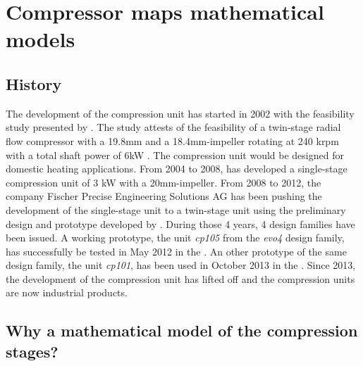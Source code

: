 \chapter{Compressor maps mathematical models}
\label{chap:cp-maps-models}
\resetallacronyms

\section{History}
\label{sec:math-model-cp-history}

The development of the compression unit has started in 2002 with the
feasibility study presented by \citet{schiffmann-godat-2002a}. The
study attests of the feasibility of a twin-stage radial flow
compressor with a 19.8mm and a 18.4mm-impeller rotating at 240 krpm
with a total shaft power of 6kW \citep[p. 12 \&
14]{schiffmann-godat-2002a}. The compression unit would be designed
for domestic heating applications. From 2004 to 2008,
\citet{schiffmann-2008a} has developed a single-stage compression
unit of 3 kW with a 20mm-impeller. From 2008 to 2012, the company
Fischer Precise Engineering Solutions AG
has been pushing the development of the single-stage unit to a
twin-stage unit using the preliminary design and prototype developed
by \citet{schiffmann-2008a}. During those 4 years, 4 design families
have been issued. A working prototype, the unit
\textit{cp105} from the \textit{evo4} design family, has successfully
be tested in May 2012 in the \AWP{}. An other prototype of the same
design family, the unit \textit{cp101}, has been used in October 2013
in the \BWP{}. Since 2013, the development of the compression unit has
lifted off and the compression units are now industrial products.

\section{Why a mathematical model of the compression stages?}
\label{sec:math-model-why}

